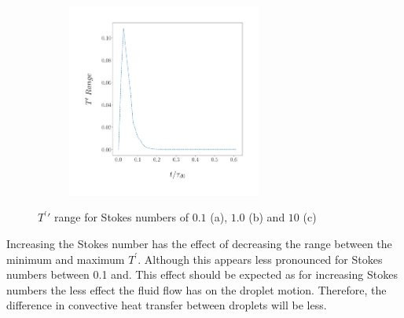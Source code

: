 \documentclass[../Interim_Report_Master]{subfiles}
\begin{document}
\begin{figure}\ContinuedFloat
	\centering
	\begin{subfigure}{\textwidth}
		\centering
		\includegraphics[width=0.7\textwidth]{./Diagrams/Temp_Deviation_10.png}
		\caption{}
	\end{subfigure}
	\caption{${T^\prime}'$ range for Stokes numbers of $0.1$ (a), $1.0$ (b) and $10$ (c)}
	\label{fig:t_prime_stks}
\end{figure}

Increasing the Stokes number has the effect of decreasing the range between the minimum and maximum $T^\prime$. Although this appears less pronounced for Stokes numbers between 0.1 and. This effect should be expected as for increasing Stokes numbers the less effect the fluid flow has on the droplet motion. Therefore, the difference in convective heat transfer between droplets will be less.
\end{document}
